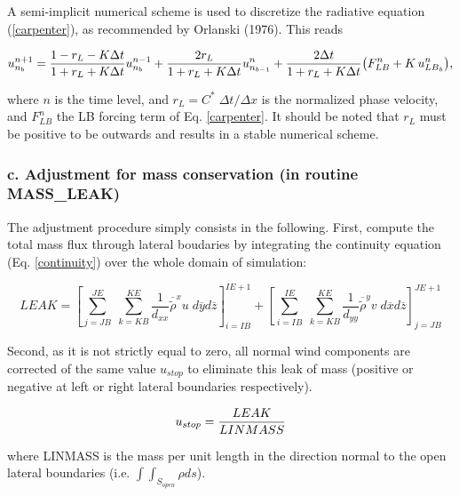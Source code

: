  A semi-implicit numerical scheme is used to discretize the
radiative equation (\ref{carpenter}), as recommended by Orlanski (1976).
This reads

\begin{equation}
u^{n+1}_{n_b} =  {1-r_L-K \Delta t \over 1+r_L+K \Delta t} u^{n-1}_{n_b}
               + {2 r_L            \over 1+r_L+K \Delta t} u^{n  }_{n_{b-1}}
               + {2 \Delta t       \over 1+r_L+K \Delta t}
                             {\left( F^{n}_{LB} +K \, u^{n}_{{LB}_b} \right)},
\end{equation}


\noindent
where $n$ is the time level, and
$r_L = C^* \; \Delta  t / \Delta x $ is the normalized phase
velocity, and $F^{n}_{LB}$ the LB forcing term of Eq. \ref{carpenter}. It should
be noted that $r_L$ must be positive to be outwards and results in a stable
numerical scheme.

\subsubsection{c. Adjustment for mass conservation (in routine MASS\_LEAK)}

The adjustment procedure simply consists in the following.
First, compute the total mass flux through lateral boudaries by integrating
the continuity equation (Eq. \ref{continuity}) over the whole domain of simulation:

\begin{equation}
LEAK =
 \left[{ \sum_{j=JB}^{JE} \; \sum_{k=KB}^{KE}
 \dfrac{1}{d_{xx} } \overline{  {\tilde{\rho} } }^{x} u \;
d{\overline{y}} d{\overline{z}} }\right]_{i=IB}^{IE+1}
+\left[{ \sum_{i=IB}^{IE} \; \sum_{k=KB}^{KE}
 \dfrac{1}{d_{yy} } \overline{  {\tilde{\rho} } }^{y} v \;
d{\overline{x}} d{\overline{z}} }\right]_{j=JB}^{JE+1}
\end{equation}

Second, as it is not strictly equal to zero, all normal wind components are
corrected of the same value $u_{stop}$ to eliminate this leak of mass
(positive or negative at left or right lateral boundaries respectively).

\begin{equation}
u_{stop} = {LEAK \over LINMASS}
\end{equation}

\noindent where LINMASS is the mass per unit length
in the direction normal to the open
lateral boundaries (i.e. $\int \int_{S_{open}}\rho ds$).

